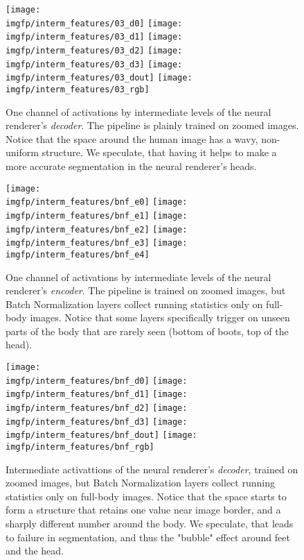 \begin{figure}
	\centering
	\texttt{[image: \\imgfp/interm\_features/03\_d0]}%
	\hfill\texttt{[image: \\imgfp/interm\_features/03\_d1]}%
	\hfill\texttt{[image: \\imgfp/interm\_features/03\_d2]}%
	\hfill\texttt{[image: \\imgfp/interm\_features/03\_d3]}%
	\hfill\texttt{[image: \\imgfp/interm\_features/03\_dout]}%
	\hfill\texttt{[image: \\imgfp/interm\_features/03\_rgb]}
	\caption{One channel of activations by intermediate levels of the neural renderer's \textit{decoder}. The pipeline is plainly trained on zoomed images. Notice that the space around the human image has a wavy, non-uniform structure. We speculate, that having it helps to make a more accurate segmentation in the neural renderer's heads. }
	\label{aux:interm03_decoder}
\end{figure}
\begin{figure}
	\centering
	\texttt{[image: \\imgfp/interm\_features/bnf\_e0]}%
	\hfill\texttt{[image: \\imgfp/interm\_features/bnf\_e1]}%
	\hfill\texttt{[image: \\imgfp/interm\_features/bnf\_e2]}%
	\hfill\texttt{[image: \\imgfp/interm\_features/bnf\_e3]}%
	\hfill\texttt{[image: \\imgfp/interm\_features/bnf\_e4]}%
	\caption{One channel of activations by intermediate levels of the neural renderer's \textit{encoder}. The pipeline is trained on zoomed images, but Batch Normalization layers collect running statistics only on full-body images. Notice that some layers specifically trigger on unseen parts of the body that are rarely seen (bottom of boots, top of the head).}
	\label{aux:interm06_encoder}
\end{figure}
\begin{figure}
	\centering
	\texttt{[image: \\imgfp/interm\_features/bnf\_d0]}%
	\hfill\texttt{[image: \\imgfp/interm\_features/bnf\_d1]}%
	\hfill\texttt{[image: \\imgfp/interm\_features/bnf\_d2]}%
	\hfill\texttt{[image: \\imgfp/interm\_features/bnf\_d3]}%
	\hfill\texttt{[image: \\imgfp/interm\_features/bnf\_dout]}%
	\hfill\texttt{[image: \\imgfp/interm\_features/bnf\_rgb]}%
	\caption{Intermediate activattions of the neural renderer's \textit{decoder}, trained on zoomed images, but Batch Normalization layers collect running statistics only on full-body images. Notice that the space starts to form a structure that retains one value near image border, and a sharply different number around the body. We speculate, that leads to failure in segmentation, and thus the "bubble" effect around feet and the head. }
	\label{aux:interm06_decoder}
\end{figure}
